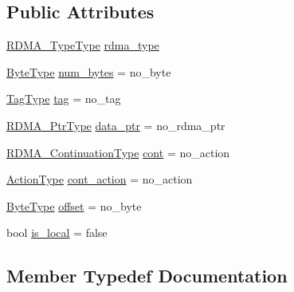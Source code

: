 \subsection*{Public Attributes}
\begin{DoxyCompactItemize}
\item 
\hyperlink{namespacevt_1_1rdma_ac848e1d9da43db6294bd06f83e5d3946}{R\+D\+M\+A\+\_\+\+Type\+Type} \hyperlink{structvt_1_1rdma_1_1_info_a123ce7dd75200e49c67ba513802c6e53}{rdma\+\_\+type}
\item 
\hyperlink{namespacevt_aab8d55968084610ce3b17057981e9300}{Byte\+Type} \hyperlink{structvt_1_1rdma_1_1_info_a7fc15ac009aac83156f7d049e8594e2e}{num\+\_\+bytes} = no\+\_\+byte
\item 
\hyperlink{namespacevt_a84ab281dae04a52a4b243d6bf62d0e52}{Tag\+Type} \hyperlink{structvt_1_1rdma_1_1_info_a7d19beb6e7a0757aea7d3a16f610b6dd}{tag} = no\+\_\+tag
\item 
\hyperlink{namespacevt_a9e2c953286c7616f7c218e9951790776}{R\+D\+M\+A\+\_\+\+Ptr\+Type} \hyperlink{structvt_1_1rdma_1_1_info_aec27c1a908087b3c0d1b962ea2a763f8}{data\+\_\+ptr} = no\+\_\+rdma\+\_\+ptr
\item 
\hyperlink{namespacevt_a9880273f1697d78c2171f8d8f044de51}{R\+D\+M\+A\+\_\+\+Continuation\+Type} \hyperlink{structvt_1_1rdma_1_1_info_a6831ea562dafc8261c3cb2274a519b6b}{cont} = no\+\_\+action
\item 
\hyperlink{namespacevt_ae0a5a7b18cc99d7b732cb4d44f46b0f3}{Action\+Type} \hyperlink{structvt_1_1rdma_1_1_info_a402c9b74d2c6d2135630a3fbbc738ce8}{cont\+\_\+action} = no\+\_\+action
\item 
\hyperlink{namespacevt_aab8d55968084610ce3b17057981e9300}{Byte\+Type} \hyperlink{structvt_1_1rdma_1_1_info_aef5c7ca049c5559876969cb84f590a93}{offset} = no\+\_\+byte
\item 
bool \hyperlink{structvt_1_1rdma_1_1_info_aca2fbe3e10b689bba2ace9bed33bd5cb}{is\+\_\+local} = false
\end{DoxyCompactItemize}


\subsection{Member Typedef Documentation}
\mbox{\label{structvt_1_1rdma_1_1_info_afb608063c839ec0e8e124f3496542991}} 
